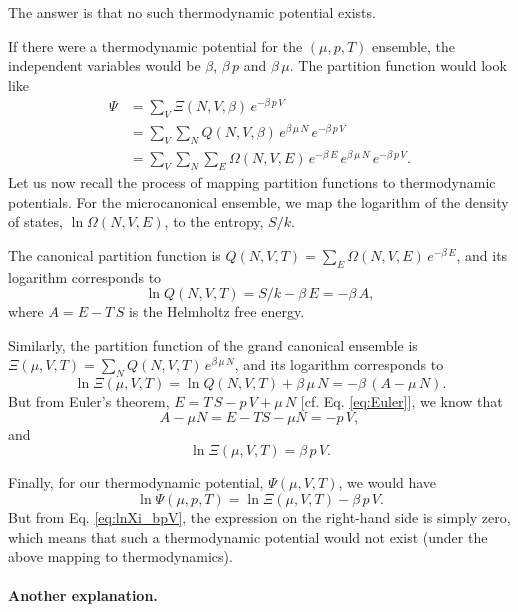 \documentclass[twocolumn, 10pt]{article}
\numberwithin{equation}{section}
\newenvironment{solution}[1][\empty]
{\par\medskip\sffamily
  \textbf{\ifx\empty#1{Solution.}\relax\else{#1}\fi} \ignorespaces}
{\medskip}
\begin{document}
\begin{solution}
The answer is that no such thermodynamic potential exists.

If there were a thermodynamic potential for the $(\mu, p, T)$ ensemble,
the independent variables would be $\beta$, $\beta \, p$ and $\beta \, \mu$.
%
The partition function would look like
\begin{align*}
  \Psi
  &=
  \sum_V \Xi(N, V, \beta) \, e^{-\beta \, p \, V}
  \\
  &=
  \sum_V \sum_N Q(N, V, \beta) \, e^{\beta \, \mu \, N} \, e^{-\beta \, p \, V}
  \\
  &=
  \sum_V \sum_N \sum_E \Omega(N, V, E) \, e^{-\beta \, E}
  \, e^{\beta \, \mu \, N} \, e^{-\beta \, p \, V}
  .
\end{align*}
%
Let us now recall the process of mapping
partition functions to thermodynamic potentials.
%
For the microcanonical ensemble,
we map the logarithm of the density of states,
$\ln \Omega(N, V, E)$,
to the entropy, $S/k$.

The canonical partition function is
$Q(N, V, T) = \sum_E \Omega(N, V, E) \, e^{-\beta \, E}$,
and its logarithm corresponds to
$$
\ln Q(N, V, T) = S/k - \beta \, E = -\beta \, A,
$$
where $A = E - T \, S$ is the Helmholtz free energy.

Similarly, the partition function
of the grand canonical ensemble is
$\Xi(\mu, V, T) = \sum_N Q(N, V, T) \, e^{\beta \, \mu \, N}$,
and its logarithm corresponds to
$$
\ln \Xi(\mu, V, T) = \ln Q(N, V, T) + \beta \, \mu \, N = -\beta \, (A - \mu \, N).
$$
But from Euler's theorem, $E = T \, S - p \, V + \mu \, N$
[cf. Eq. \eqref{eq:Euler}], we know that
$$
A - \mu N = E - T S - \mu N = -p \, V,
$$
and
\begin{equation}
  \ln \Xi(\mu, V, T) = \beta \, p \, V.
\label{eq:lnXi_bpV}
\end{equation}

Finally, for our thermodynamic potential, $\Psi(\mu, V, T)$,
we would have
$$
\ln \Psi(\mu, p, T) = \ln \Xi(\mu, V, T) - \beta \, p \, V.
$$
But from Eq. \eqref{eq:lnXi_bpV},
the expression on the right-hand side is simply zero,
which means that such a thermodynamic potential
would not exist (under the above mapping to thermodynamics).
\end{solution}

\paragraph*{Another explanation.}
\end{document}
